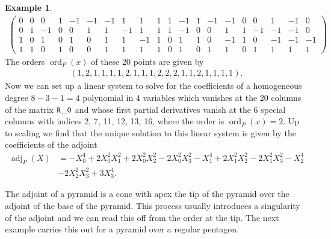 \documentclass[a4paper,10pt]{amsart}
\theoremstyle{definition}
\newtheorem{ex}[defin]{Example}
\theoremstyle{plain}
\newcommand{\ord}{\operatorname{ord}}
\newcommand{\adj}{\operatorname{adj}} %
\begin{document}
\begin{ex}
\begin{align*}
\left(\!\begin{array}{cccccccccccccccccccc}
       0&0&0&1&-1&-1&-1&1&1&1&1&-1&1&-1&-1&0&0&1&-1&0\\
       0&1&-1&0&0&1&1&-1&1&1&1&-1&0&0&1&1&-1&-1&-1&0\\
       1&0&1&0&1&0&1&1&-1&1&0&1&1&0&-1&1&0&-1&-1&-1\\
       1&1&0&1&0&0&1&1&1&1&0&1&0&1&1&0&1&1&1&1
       \end{array}\!\right) 
\end{align*} 
The orders $\ord_P(x)$ of these 20 points are given by \begin{align*}
    (1, 2, 1, 1, 1, 1, 2, 1, 1, 1, 2, 2, 2, 1, 1, 2, 1, 1, 1, 1).
\end{align*}
Now we can set up a linear system to solve for the coefficients of a homogeneous degree $8-3-1=4$ polynomial in $4$ variables which vanishes at the 20 columns of the matrix ${\tt R\_0}$ and whose first partial derivatives vanish at the 6 special columns with indices 2, 7, 11, 12, 13, 16, where the order is $\ord_P(x)=2$. Up to scaling we find that the unique solution to this linear system is given by the coefficients of the adjoint\begin{align*}
    \adj_P(X)&=-X_0^4+2X_0^2X_1^2+2X_0^2X_2^2-2X_0^2X_3^2-X_1^4+2X_1^2X_2^2-2X_1^2X_3^2-X_2^4 \\&-2X_2^2X_3^2+3X_3^4.
\end{align*}
\end{ex}

The adjoint of a pyramid is a cone with apex the tip of the pyramid over the adjoint of the base of the pyramid. This process usually introduces a singularity of the adjoint and we can read this off from the  order at the tip. The next example carries this out for a pyramid over a regular pentagon.
\end{document}
